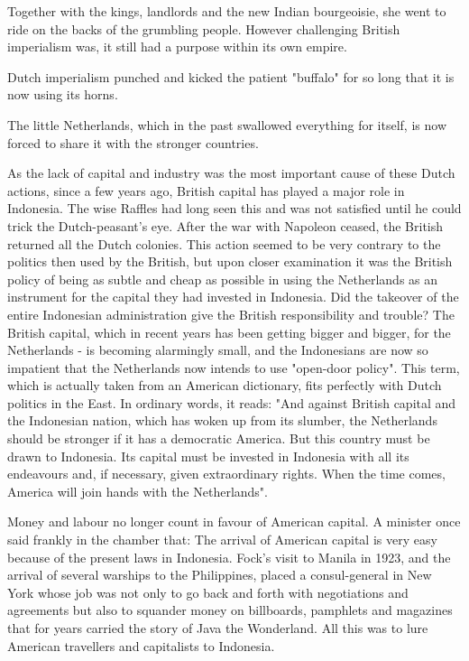 Together with the kings, landlords and the new Indian bourgeoisie, she went to 
ride on the backs of the grumbling people. However challenging British imperialism was,
it still had a purpose within its own empire.\vskip 0.2in

Dutch imperialism punched and kicked the patient "buffalo" for so long that it is now using its horns.\vskip 0.2in

The little Netherlands, which in the past swallowed everything for itself, is now forced to share it with the stronger countries.\vskip 0.2in

As the lack of capital and industry was the most important cause of these Dutch actions, 
since a few years ago, British capital has played a major role in Indonesia. 
The wise Raffles had long seen this and was not satisfied until he could trick the Dutch-peasant's eye. 
After the war with Napoleon ceased, the British returned all the Dutch colonies. This action seemed to be very 
contrary to the politics then used by the British, but upon closer examination it was the British policy of being 
as subtle and cheap as possible in using the Netherlands as an instrument for the capital they had invested in 
Indonesia. Did the takeover of the entire Indonesian administration give the British responsibility and trouble? 
The British capital, which in recent years has been getting bigger and bigger, for the Netherlands - 
is becoming alarmingly small, and the Indonesians are now so impatient that the Netherlands now intends 
to use "open-door policy". This term, which is actually taken from an American dictionary, fits perfectly 
with Dutch politics in the East. In ordinary words, it reads: "And against British capital and the Indonesian 
nation, which has woken up from its slumber, the Netherlands should be stronger if it has a democratic America. 
But this country must be drawn to Indonesia. Its capital must be invested in Indonesia with all its endeavours and, 
if necessary, given extraordinary rights. When the time comes, America will join hands with the Netherlands".\vskip 0.2in

Money and labour no longer count in favour of American capital. 
A minister once said frankly in the chamber that: The arrival of American capital is very easy because of 
the present laws in Indonesia. Fock's visit to Manila in 1923, and the arrival of several warships to the
Philippines, placed a consul-general in New York whose job was not only to go back and forth with negotiations 
and agreements but also to squander money on billboards, pamphlets and magazines that for years carried the story 
of Java the Wonderland. All this was to lure American travellers and capitalists to Indonesia.\vskip 0.2in


